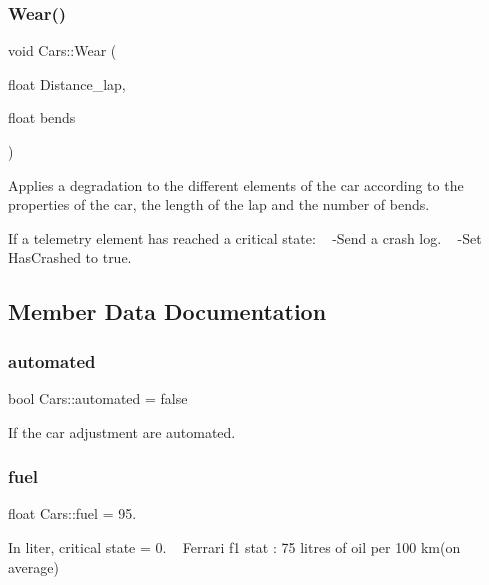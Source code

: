 \subsubsection{\texorpdfstring{Wear()}{Wear()}}
{\footnotesize\ttfamily void Cars\+::\+Wear (\begin{DoxyParamCaption}\item[{float}]{Distance\+\_\+lap,  }\item[{float}]{bends }\end{DoxyParamCaption})}

Applies a degradation to the different elements of the car according to the properties of the car, the length of the lap and the number of bends.

If a telemetry element has reached a critical state\+: ~\newline
 -\/\+Send a crash log. ~\newline
 -\/\+Set Has\+Crashed to true. 

\subsection{Member Data Documentation}
\mbox{\label{class_cars_a9d7a35a79c9151c90cac3a8f25df51fc}} 
\subsubsection{\texorpdfstring{automated}{automated}}
{\footnotesize\ttfamily bool Cars\+::automated = false}



If the car adjustment are automated. 

\mbox{\label{class_cars_a547066e8556129b421ee00ae008c954f}} 
\subsubsection{\texorpdfstring{fuel}{fuel}}
{\footnotesize\ttfamily float Cars\+::fuel = 95.}

In liter, critical state = 0. ~\newline
 Ferrari f1 stat \+: 75 litres of oil per 100 km(on average) \mbox{\label{class_cars_a8265aac52bf5ecbbeffc350ae07a9a2a}} 
